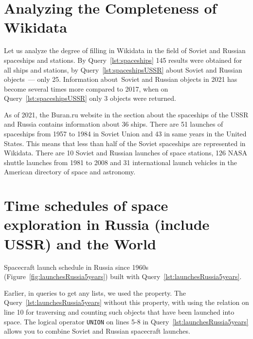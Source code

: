 \section{Analyzing the Completeness of Wikidata}

Let us analyze the degree of filling in Wikidata in the field of Soviet and Russian spaceships and stations.
By Query~\ref{lst:spaceships} 145 results were obtained for all ships and stations,
by Query~\ref{lst:spaceshipsUSSR} about Soviet and Russian objects~--- only 25.
Information about~Soviet and Russian objects in 2021
has become several times more compared to 2017,
when on Query~\ref{lst:spaceshipsUSSR} only 3 objects were returned.

As of 2021, the Buran.ru website in the section about the spaceships of the USSR and Russia contains information about 36 ships.\autocite{spacecraftBuran} %
There are 51 launches of spaceships from 1957 to 1984 in Soviet Union and 43 in same years in the United States.\autocite[480-483]{spacecraftCosmonavtika} This means that less than half of the Soviet spaceships are represented in Wikidata.
There are 10 Soviet and Russian launches of space stations\autocite[296]{spacecraftSAA},
126 NASA shuttle launches from 1981 to 2008\autocite[288]{spacecraftSAA}
and 31 international launch vehicles\autocite[290-291]{spacecraftSAA} in the American directory of space and astronomy.

\section{Time schedules of space exploration in Russia (include USSR) and the World}

Spacecraft launch schedule in Russia since 1960s (Figure~\ref{fig:launchesRussia5years})
built with Query~\ref{lst:launchesRussia5years}.%

Earlier, in queries to get any lists, we used the  property.
The Query~\ref{lst:launchesRussia5years} without this property, with using the relation
 on line 10
for traversing and counting such objects that have been launched into space.
%
\label{question:spacecraft_1}%
%
%
The logical operator \lstinline|UNION| on lines 5-8 in Query~\ref{lst:launchesRussia5years}
allows you to combine Soviet and Russian spacecraft launches.

